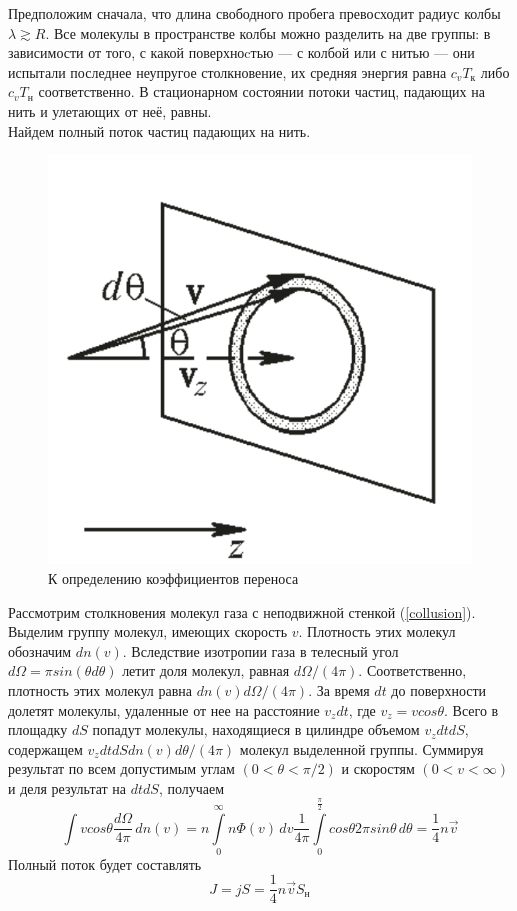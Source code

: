 \documentclass[12pt]{article}
\begin{document}
        Предположим сначала, что длина свободного пробега превосходит радиус колбы $\lambda \gtrsim R$.
        Все молекулы в пространстве колбы можно разделить на две группы: в зависимости от того, с какой поверхноcтью — 
        с колбой или с нитью — они испытали последнее неупругое столкновение, их средняя энергия равна $c_vT_\text{к}$ либо $c_vT_\text{н}$
        соответственно. В стационарном состоянии потоки частиц, падающих на нить и улетающих от неё, равны.\\
        Найдем полный поток частиц падающих на нить.
        \begin{figure}[H]
            \centering
            \includegraphics[width=0.4\linewidth]{collision_with_wall.png}
            \caption{К определению коэффициентов переноса}
            \label{collision}
        \end{figure}
        Рассмотрим столкновения молекул газа с неподвижной стенкой (\ref{collusion}). Выделим группу молекул, 
        имеющих скорость $v$. Плотность этих молекул обозначим $dn(v)$. Вследствие изотропии газа в телесный угол 
        $d\Omega = \pi sin(\theta d\theta)$ летит доля молекул, равная $d\Omega/(4\pi)$. Соответственно, 
        плотность этих молекул равна $dn(v)d\Omega/(4\pi)$. За время $dt$ до поверхности долетят молекулы, удаленные 
        от нее на расстояние $v_zdt$, где $v_z = v cos\theta$. Всего в площадку $dS$ попадут молекулы, находящиеся в 
        цилиндре объемом $v_zdtdS$, содержащем $v_zdtdSdn(v)d\theta/(4\pi)$ молекул выделенной группы. Суммируя результат 
        по всем допустимым углам $(0 < \theta < \pi/2)$ и скоростям $(0 < v < \infty)$ и деля результат на $dtdS$, получаем
        \begin{equation}
            \int\limits vcos\theta\frac{d\Omega}{4\pi}\,dn(v) = n\int\limits_0^\infty n\Phi(v)\,dv \frac{1}{4\pi}\int\limits_0^\frac{\pi}{2} cos\theta 2\pi sin\theta\,d\theta = \frac{1}{4}n\vec{v}
        \end{equation}
        Полный поток будет составлять
        \[
            J = jS = \frac{1}{4}n\vec{v}S_{\text{н}}
        \]  
\end{document}

